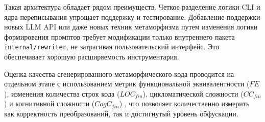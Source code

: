 Такая архитектура обладает рядом преимуществ. Четкое разделение логики CLI и ядра переписывания упрощает поддержку и тестирование. Добавление поддержки новых LLM API или даже новых техник метаморфизма путем изменения логики формирования промптов требует модификации только внутреннего пакета \texttt{internal/rewriter}, не затрагивая пользовательский интерфейс. Это обеспечивает хорошую расширяемость инструментария.

Оценка качества сгенерированного метаморфического кода проводится на отдельном этапе с использованием метрик функциональной эквивалентности ($FE$), изменения количества строк кода ($LOC_{fin}$), цикломатической сложности ($CC_{fin}$) \cite{McCabe76Complexity} и когнитивной сложности ($CogC_{fin}$) \cite{SonarSourceCogC}, что позволяет количественно измерить как корректность преобразований, так и достигнутый уровень обфускации.